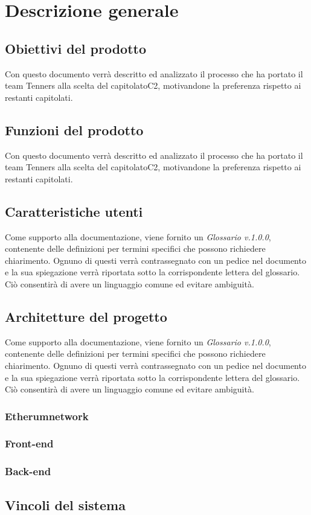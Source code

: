 \section{Descrizione generale}

\subsection{Obiettivi del prodotto}
Con questo documento verrà descritto ed analizzato il processo che ha portato il team Tenners alla scelta del capitolato\glo C2, motivandone la preferenza rispetto ai restanti capitolati.

\subsection{Funzioni del prodotto}
Con questo documento verrà descritto ed analizzato il processo che ha portato il team Tenners alla scelta del capitolato\glo C2, motivandone la preferenza rispetto ai restanti capitolati.
	
\subsection{Caratteristiche utenti}
Come supporto alla documentazione, viene fornito un \textit{Glossario v.1.0.0}, contenente delle definizioni per termini specifici che possono richiedere chiarimento. Ognuno di questi verrà contrassegnato con un pedice \glo nel documento e la sua spiegazione verrà riportata sotto la corrispondente lettera del glossario. Ciò consentirà di avere un linguaggio comune ed evitare ambiguità.

\subsection{Architetture del progetto}
Come supporto alla documentazione, viene fornito un \textit{Glossario v.1.0.0}, contenente delle definizioni per termini specifici che possono richiedere chiarimento. Ognuno di questi verrà contrassegnato con un pedice \glo nel documento e la sua spiegazione verrà riportata sotto la corrispondente lettera del glossario. Ciò consentirà di avere un linguaggio comune ed evitare ambiguità. 
\subsubsection{Etherum\glo network}
\subsubsection{Front-end}
\subsubsection{Back-end}
	
\subsection{Vincoli del sistema}


	
	
	